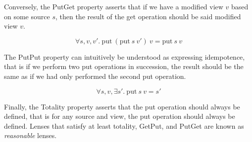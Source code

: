 \documentclass[10pt]{article}
\begin{document}
Conversely, the PutGet property asserts that if we have a modified view $v$ based on some source $s$, then the result of the get operation should be said modified view $v$.

\begin{definition}[PutPut]
  \[
    \forall s,v,v'.\ \text{put}\ (\text{put}\ s\ v')\ v = \text{put}\ s\ v
  \]
\end{definition}

The PutPut property can intuitively be understood as expressing idempotence, that is if we perform two put operations in succession, the result should be the same as if we had only performed the second put operation.

\begin{definition}[Totality]
  \[
    \forall s, v, \exists s'.\ \text{put}\ s\ v = s'
  \]
\end{definition}

Finally, the Totality property asserts that the put operation should always be defined, that is for any source and view, the put operation should always be defined. Lenses that satisfy at least totality, GetPut, and PutGet are known as \textit{reasonable} lenses.

\printbibliography
\end{document}
